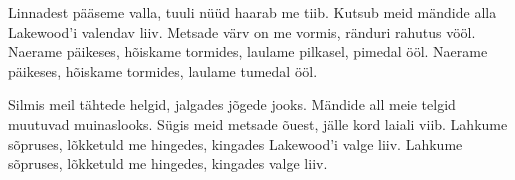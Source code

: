 Linnadest p\"a\"aseme valla,
tuuli n\"u\"ud haarab me tiib.
Kutsub meid m\"andide alla
Lakewood'i valendav liiv.
Metsade v\"arv on me vormis,
r\"anduri rahutus v\"o\"ol.
Naerame p\"aikeses, h\~oiskame tormides,
laulame pilkasel, pimedal \"o\"ol.
Naerame p\"aikeses, h\~oiskame tormides,
laulame tumedal \"o\"ol.

Silmis meil t\"ahtede helgid,
jalgades j\~ogede jooks.
M\"andide all meie telgid
muutuvad muinaslooks.
S\"ugis meid metsade \~ouest,
j\"alle kord laiali viib.
Lahkume s\~opruses, l\~okketuld me hingedes,
kingades Lakewood'i valge liiv. 
Lahkume s\~opruses, l\~okketuld me hingedes,
kingades valge liiv. 
